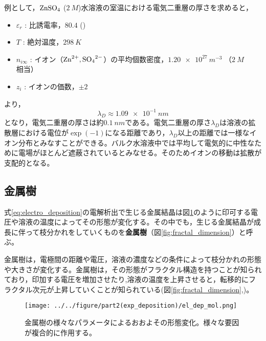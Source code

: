 \documentclass[autodetect-engine,dvi=dvipdfmx,a4paper,ja=standard,oneside,openany]{bxjsbook}
\begin{document}
例として，$\ce{ZnSO_4}$ ($\SI{2}{M}$)水溶液の室温における電気二重層の厚さを求めると，
\begin{itemize}
  \item $\varepsilon_r$ : 比誘電率，$80.4$ ()
  \item $T$ : 絶対温度，$\SI{298}{K}$
  \item $n_{i\infty}$ : イオン（$\ce{Zn^{2+},SO_4^{2-}}$）の平均個数密度，$\SI{1.20e27}{m^{-3}}$ （$\SI{2}{M}$相当）
  \item $z_i$ : イオンの価数，$\pm2$
\end{itemize}
より，
\begin{equation}
  \lambda_D\approx \SI{1.09e-1}{nm}
\end{equation}
となり，電気二重層の厚さは約$\SI{0.1}{nm}$である。電気二重層の厚さ$\lambda_D$は溶液の拡散層における電位が$\exp(-1)$になる距離であり，$\lambda_D$以上の距離では一様なイオン分布とみなすことができる。バルク水溶液中では平均して電気的に中性なために電場がほとんど遮蔽されているとみなせる。そのためイオンの移動は拡散が支配的となる。
\subsection{金属樹}
式\eqref{eq:electro_deposition}の電解析出で生じる金属結晶は図\ref{fig:el_dep_mol}のように印可する電圧や溶液の温度によってその形態が変化する\cite{suda2003temperature}。その中でも，生じる金属結晶が成長に伴って枝分かれをしていくものを\textbf{金属樹}（図\ref{fig:fractal_dimension}）と呼ぶ。

金属樹は，電極間の距離や電圧，溶液の濃度などの条件によって枝分かれの形態や大きさが変化する。金属樹は，その形態がフラクタル構造を持つことが知られており，印加する電圧を増加させたり\cite{matsushita1984fractal},溶液の温度を上昇させると\cite{suda2003temperature}，転移的にフラクタル次元が上昇していくことが知られている(図\ref{fig:fractal_dimension},)。
\begin{figure}[htbp]
  \centering
  \texttt{[image: ../../figure/part2(exp\_deposition)/el\_dep\_mol.png]}
  \caption{金属樹の様々なパラメータによるおおよその形態変化。様々な要因が複合的に作用する\cite{suda2003temperature}。}
  \label{fig:el_dep_mol}
\end{figure}
\end{document}
